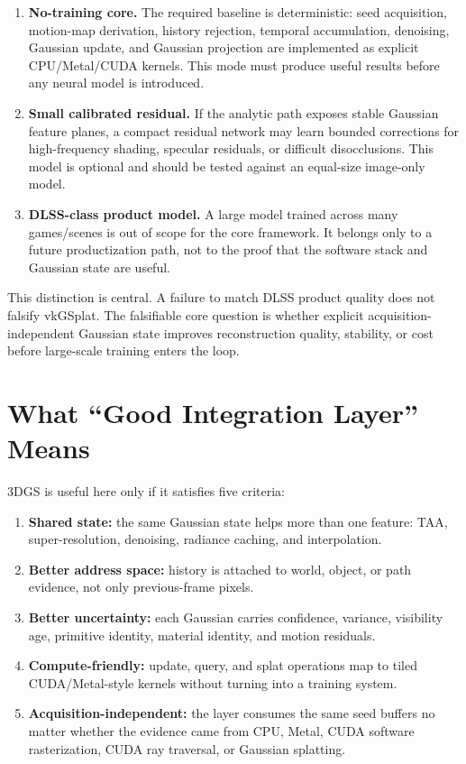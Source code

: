 \documentclass[11pt]{article}
\begin{document}
\begin{enumerate}
  \item \textbf{No-training core.} The required baseline is deterministic:
        seed acquisition, motion-map derivation, history rejection, temporal
        accumulation, denoising, Gaussian update, and Gaussian projection are
        implemented as explicit CPU/Metal/CUDA kernels. This mode must produce
        useful results before any neural model is introduced.
  \item \textbf{Small calibrated residual.} If the analytic path exposes stable
        Gaussian feature planes, a compact residual network may learn bounded
        corrections for high-frequency shading, specular residuals, or
        difficult disocclusions. This model is optional and should be tested
        against an equal-size image-only model.
  \item \textbf{DLSS-class product model.} A large model trained across many
        games/scenes is out of scope for the core framework. It belongs only to
        a future productization path, not to the proof that the software stack
        and Gaussian state are useful.
\end{enumerate}

This distinction is central. A failure to match DLSS product quality does not
falsify vkGSplat. The falsifiable core question is whether explicit
acquisition-independent Gaussian state improves reconstruction quality,
stability, or cost before large-scale training enters the loop.

\section{What ``Good Integration Layer'' Means}

3DGS is useful here only if it satisfies five criteria:

\begin{enumerate}
  \item \textbf{Shared state:} the same Gaussian state helps more than one
        feature: TAA, super-resolution, denoising, radiance caching, and
        interpolation.
  \item \textbf{Better address space:} history is attached to world, object, or
        path evidence, not only previous-frame pixels.
  \item \textbf{Better uncertainty:} each Gaussian carries confidence, variance,
        visibility age, primitive identity, material identity, and motion
        residuals.
  \item \textbf{Compute-friendly:} update, query, and splat operations map to
        tiled CUDA/Metal-style kernels without turning into a training system.
  \item \textbf{Acquisition-independent:} the layer consumes the same seed
        buffers no matter whether the evidence came from CPU, Metal, CUDA
        software rasterization, CUDA ray traversal, or Gaussian splatting.
\end{enumerate}
\end{document}
